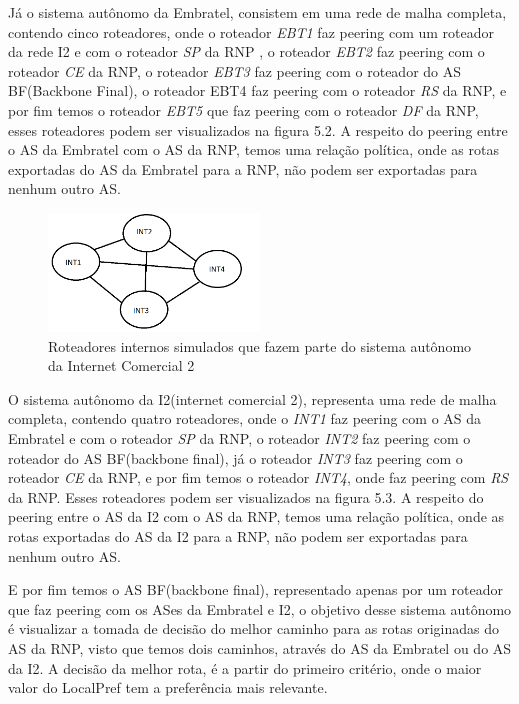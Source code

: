 \documentclass[12pt,a4paper]{report}
\begin{document}
J\'a o sistema aut\^onomo da Embratel, consistem em uma rede de malha completa, contendo cinco roteadores, onde o roteador \textit{EBT1} faz peering com um roteador da rede I2 e com o roteador \textit{SP} da RNP , o roteador \textit{EBT2} faz peering com o roteador \textit{CE} da RNP, o roteador \textit{EBT3} faz peering com o roteador do AS BF(Backbone Final), o roteador EBT4 faz peering com o roteador \textit{RS} da RNP, e por fim temos o roteador \textit{EBT5} que faz peering com o roteador \textit{DF} da RNP, esses roteadores podem ser visualizados na figura 5.2. A respeito do peering entre o AS da Embratel com o AS da RNP, temos uma rela\c{c}\~ao pol\'itica, onde as rotas exportadas do AS da Embratel para a RNP, n\~ao podem ser exportadas para nenhum outro AS.

\begin{figure}[!htb]
 \centering
 \includegraphics[width=0.5\textwidth]{Imagens/I2_1_}
  \caption{\label{fig:Internet Comercial 2} Roteadores internos simulados que fazem parte do sistema aut\^onomo da Internet Comercial 2}
\end{figure}

O sistema aut\^onomo da I2(internet comercial 2), representa uma rede de malha completa, contendo quatro roteadores, onde o \textit{INT1} faz peering com o AS da Embratel e com o roteador \textit{SP} da RNP, o roteador \textit{INT2} faz peering com o roteador do AS BF(backbone final), j\'a o roteador \textit{INT3} faz peering com o roteador \textit{CE} da RNP, e por fim temos o roteador \textit{INT4}, onde faz peering com \textit{RS} da RNP.  Esses roteadores podem ser visualizados na figura 5.3. A respeito do peering entre o AS da I2 com o AS da RNP, temos uma rela\c{c}\~ao pol\'itica, onde as rotas exportadas do AS da I2 para a RNP, n\~ao podem ser exportadas para nenhum outro AS.

E por fim temos o AS BF(backbone final), representado apenas por um roteador que faz peering com os ASes da Embratel e I2, o objetivo desse sistema aut\^onomo \'e visualizar a tomada de decis\~ao do melhor caminho para as rotas originadas do AS da RNP, visto que temos dois caminhos, atrav\'es do AS da Embratel ou do AS da I2. A decis\~ao da melhor rota, \'e a partir do primeiro crit\'erio, onde o maior valor do LocalPref tem a prefer\^encia mais relevante.
\end{document}
